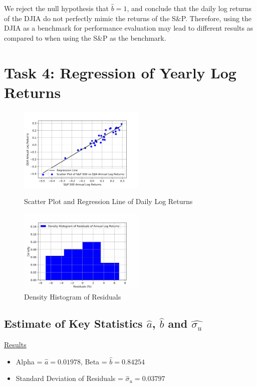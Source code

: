 \documentclass[a4paper]{article}
\begin{document}
	We reject the null hypothesis that $\hat{b}=1$, and conclude that the daily log returns of the DJIA do not perfectly mimic the returns of the S\&P. Therefore, using the DJIA as a benchmark for performance evaluation may lead to different results as compared to when using the S\&P as the benchmark. 
		
	\section*{Task 4: Regression of Yearly Log Returns}
	\label{sec:num2}
	
	\begin{figure}[htbp]
		\centering
		\begin{minipage}[t]{0.48\textwidth}
			\centering
			\includegraphics[width=6cm]{Ann_Scatter.png}
			\captionsetup{font=small}
			\caption{Scatter Plot and Regression Line of Daily Log Returns}
		\end{minipage}
		\begin{minipage}[t]{0.48\textwidth}
			\centering
			\includegraphics[width=6cm]{Ann_Hist.jpeg}
			\captionsetup{font=small}
			\caption{Density Histogram of Residuals}
		\end{minipage}
	\end{figure}
	
	\subsection{Estimate of Key Statistics $\hat{a}$, $\hat{b}$ and $\hat{\sigma_u}$}
	\underline{Results}
	\begin{itemize}[nosep]
		\item Alpha = $\hat{a} = 0.01978$, Beta = $\hat{b} = 0.84254$
		\item Standard Deviation of Residuals = $\hat{\sigma}_{u} = 0.03797$
	\end{itemize}
\end{document}

